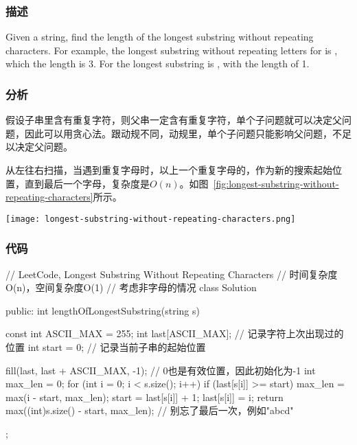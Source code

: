 \subsubsection{描述}
Given a string, find the length of the longest substring without repeating characters. For example, the longest substring without repeating letters for  is , which the length is 3. For  the longest substring is , with the length of 1.


\subsubsection{分析}
假设子串里含有重复字符，则父串一定含有重复字符，单个子问题就可以决定父问题，因此可以用贪心法。跟动规不同，动规里，单个子问题只能影响父问题，不足以决定父问题。

从左往右扫描，当遇到重复字母时，以上一个重复字母的，作为新的搜索起始位置，直到最后一个字母，复杂度是$O(n)$。如图~\ref{fig:longest-substring-without-repeating-characters}所示。

\begin{center}
\texttt{[image: longest-substring-without-repeating-characters.png]}\\
\label{fig:longest-substring-without-repeating-characters}
\end{center}


\subsubsection{代码}
\begin{Code}
// LeetCode, Longest Substring Without Repeating Characters
// 时间复杂度O(n)，空间复杂度O(1)
// 考虑非字母的情况
class Solution {
public:
    int lengthOfLongestSubstring(string s) {
        const int ASCII_MAX = 255;
        int last[ASCII_MAX]; // 记录字符上次出现过的位置
        int start = 0; // 记录当前子串的起始位置

        fill(last, last + ASCII_MAX, -1); // 0也是有效位置，因此初始化为-1
        int max_len = 0;
        for (int i = 0; i < s.size(); i++) {
            if (last[s[i]] >= start) {
                max_len = max(i - start, max_len);
                start = last[s[i]] + 1;
            }
            last[s[i]] = i;
        }
        return max((int)s.size() - start, max_len);  // 别忘了最后一次，例如"abcd"
    }
};
\end{Code}


